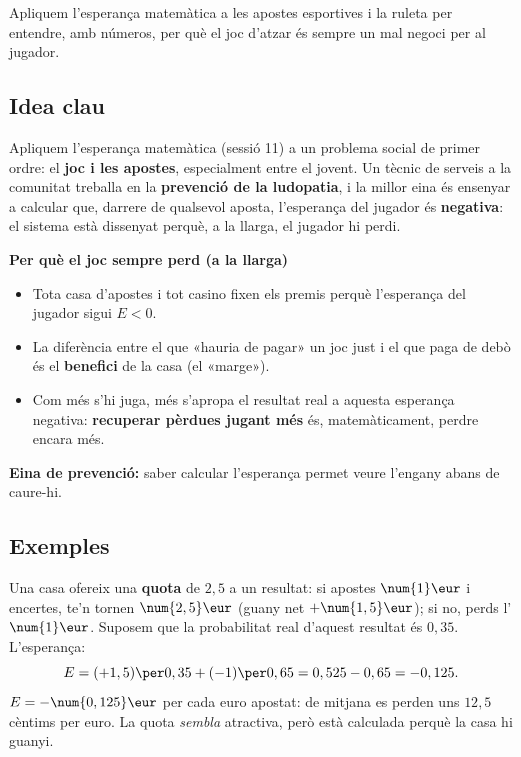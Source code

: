 %
{Apliquem l'esperança matemàtica a les apostes esportives i la ruleta per entendre, amb números, per què el joc d'atzar és sempre un mal negoci per al jugador.}

\subsection{Idea clau}

Apliquem l'esperança matemàtica (sessió 11) a un problema social de primer ordre: el
\textbf{joc i les apostes}, especialment entre el jovent. Un tècnic de serveis a la
comunitat treballa en la \textbf{prevenció de la ludopatia}, i la millor eina és
ensenyar a calcular que, darrere de qualsevol aposta, l'esperança del jugador és
\textbf{negativa}: el sistema està dissenyat perquè, a la llarga, el jugador hi perdi.

\begin{idea}
\textbf{Per què el joc sempre perd (a la llarga)}
\begin{itemize}[leftmargin=1.4em, itemsep=2pt]
  \item Tota casa d'apostes i tot casino fixen els premis perquè l'esperança del
        jugador sigui $E<0$.
  \item La diferència entre el que «hauria de pagar» un joc just i el que paga de debò és
        el \textbf{benefici} de la casa (el «marge»).
  \item Com més s'hi juga, més s'apropa el resultat real a aquesta esperança negativa:
        \textbf{recuperar pèrdues jugant més} és, matemàticament, perdre encara més.
\end{itemize}
\textbf{Eina de prevenció:} saber calcular l'esperança permet veure l'engany abans de
caure-hi.
\end{idea}

\subsection{Exemples}

\begin{exemple}
Una casa ofereix una \textbf{quota} de $2,5$ a un resultat: si apostes $\num{1}\eur$ i
encertes, te'n tornen $\num{2,5}\eur$ (guany net $+\num{1,5}\eur$); si no, perds
l'$\num{1}\eur$. Suposem que la probabilitat real d'aquest resultat és $0,35$. L'esperança:
\[
E = (+1,5)\per 0,35 + (-1)\per 0,65 = 0,525 - 0,65 = -0,125.
\]
$E=-\num{0,125}\eur$ per cada euro apostat: de mitjana es perden uns $12,5$ cèntims per
euro. La quota \emph{sembla} atractiva, però està calculada perquè la casa hi guanyi.
\end{exemple}

